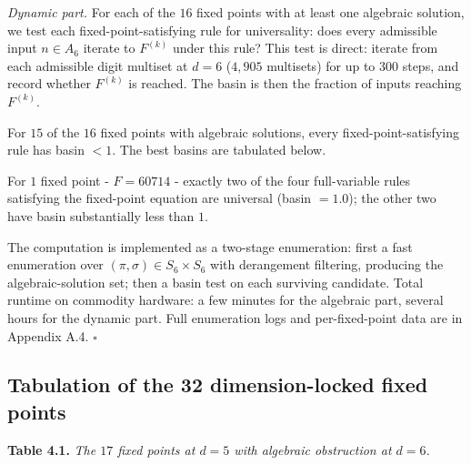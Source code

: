 \documentclass[11pt,letterpaper]{article}
\theoremstyle{paperstyle}
\theoremstyle{paperstyledef}
\theoremstyle{paperstylerem}
\begin{document}
\emph{Dynamic part.} For each of the \(16\) fixed points with at least
one algebraic solution, we test each fixed-point-satisfying rule for
universality: does every admissible input \(n \in A_6\) iterate to
\(F^{(k)}\) under this rule? This test is direct: iterate from each
admissible digit multiset at \(d = 6\) (\(4{,}905\) multisets) for up to
\(300\) steps, and record whether \(F^{(k)}\) is reached. The basin is
then the fraction of inputs reaching \(F^{(k)}\).

For \(15\) of the \(16\) fixed points with algebraic solutions, every
fixed-point-satisfying rule has basin \(< 1\). The best basins are
tabulated below.

For \(1\) fixed point - \(F = 60714\) - exactly two of the four
full-variable rules satisfying the fixed-point equation are universal
(basin \(= 1.0\)); the other two have basin substantially less than
\(1\).

The computation is implemented as a two-stage enumeration: first a fast
enumeration over \((\pi, \sigma) \in S_6 \times S_6\) with derangement
filtering, producing the algebraic-solution set; then a basin test on
each surviving candidate. Total runtime on commodity hardware: a few
minutes for the algebraic part, several hours for the dynamic part. Full
enumeration logs and per-fixed-point data are in Appendix A.4.
\(\square\)

\hypertarget{tabulation-of-the-32-dimension-locked-fixed-points}{%
\subsection{Tabulation of the 32 dimension-locked fixed points}\label{tabulation-of-the-32-dimension-locked-fixed-points}}

\textbf{Table 4.1.} \emph{The \(17\) fixed points at \(d = 5\) with
algebraic obstruction at \(d = 6\).}
\end{document}
